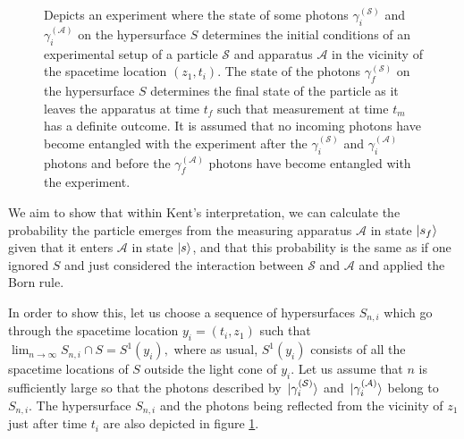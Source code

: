 \begin{figure}[ht!]
	\vspace*{2px}
	\caption{Depicts an experiment where the state of some photons $\gamma_i^{(\mathcal{S})}$ and $\gamma_i^{(\mathcal{A})}$ on the hypersurface $S$ determines the initial conditions of an experimental setup of a particle $\mathcal{S}$ and apparatus $\mathcal{A}$ in the vicinity of the spacetime location $(z_1, t_i)$. The state of the photons $\gamma_f^{(\mathcal{S})}$ on the hypersurface $S$ determines the final state of the particle as it leaves the apparatus at time $t_f$ such that measurement at time $t_m$ has a definite outcome. It is assumed that no incoming photons have become entangled with the experiment after the $\gamma_i^{(\mathcal{S})}$ and $\gamma_i^{(\mathcal{A})}$ photons and before the $\gamma_f^{(\mathcal{A})}$ photons have become entangled with the experiment.  }
	\label{pisolution}
	\end{figure}


We aim to show that within Kent's interpretation, we can calculate the probability the particle emerges from the measuring apparatus $\mathcal{A}$ in state $\ket{s_{f}}$ given that it enters $\mathcal{A}$ in state $\ket{s}$, and that this probability is the same as if one ignored $S$ and just considered the interaction between $\mathcal{S}$ and $\mathcal{A}$ and applied the Born rule. 

In order to show this, let us choose a sequence of hypersurfaces $S_{n,i}$ which go through the spacetime location $y_i=(t_i, z_1)$ such that $\lim_{n\rightarrow\infty} S_{n,i}\cap S=S^1(y_i),$ where as usual,  $S^1(y_i)$ consists of all the spacetime locations of $S$ outside the light cone of $y_i$. Let us assume that $n$ is sufficiently large so that the photons described by $\ket*{\gamma_i^{(\mathcal{S})}}$ and $\ket*{\gamma_i^{(\mathcal{A})}}$ belong to $S_{n,i}$. The hypersurface $S_{n,i}$ and the photons being reflected from the vicinity of $z_1$ just after time $t_i$ are also depicted in figure \ref{pisolution}.


